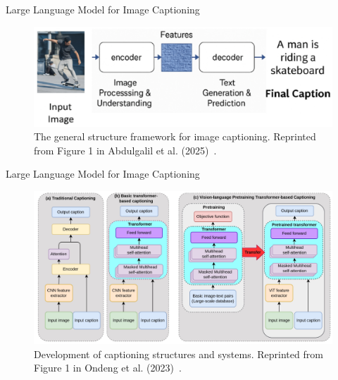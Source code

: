 \documentclass[12pt]{beamer}
\begin{document}
\begin{frame}[allowframebreaks]{Large Language Model for Image Captioning}
    \begin{figure}
        \centering
        \includegraphics[width=0.9\linewidth]{figures/image_captioning.png}
        \caption{The general structure framework for image captioning. Reprinted from Figure 1 in Abdulgalil et al. (2025)~\cite{ABDULGALIL2025100159}.}
        \label{fig:Fig. 9}
    \end{figure}
\end{frame}

\begin{frame}[allowframebreaks]{Large Language Model for Image Captioning}
    \begin{figure}
        \centering
        \includegraphics[width=0.99\linewidth]{figures/transformer_image_captioning.png}
        \caption{Development of captioning structures and systems. Reprinted from Figure 1 in Ondeng et al. (2023)~\cite{app131911103}.}
        \label{fig:Fig. 10}
    \end{figure}
\end{frame}
\end{document}
